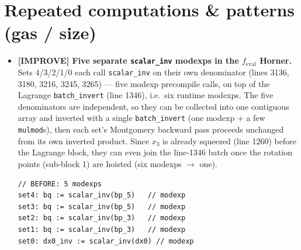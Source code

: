 \section{Repeated computations \& patterns (gas / size)}
\label{sec:pr-gas}

\begin{itemize}
  \item \textcolor{codegenblue}{\textbf{[IMPROVE] Five separate
        \texttt{scalar\_inv} modexps in the $f_\text{eval}$ Horner.}}
        Sets 4/3/2/1/0 each call \texttt{scalar\_inv} on their own
        denominator (lines 3136, 3180, 3216, 3245, 3265) --- five
        modexp precompile calls, on top of the Lagrange
        \texttt{batch\_invert} (line 1346), i.e.\ six runtime modexps. The
        five denominators are independent,
        so they can be collected into one contiguous array and inverted
        with a single \texttt{batch\_invert} (one modexp + a few
        \texttt{mulmod}s), then each set's Montgomery backward pass
        proceeds unchanged from its own inverted product. Since $x_3$ is
        already squeezed (line 1260) before the Lagrange block, they can
        even join the line-1346 batch once the rotation points
        (sub-block 1) are hoisted (six modexps $\to$ one).
\begin{lstlisting}[style=yul]
// BEFORE: 5 modexps
set4: bq := scalar_inv(bp_5)   // modexp
set3: bq := scalar_inv(bp_5)   // modexp
set2: bq := scalar_inv(bp_3)   // modexp
set1: bq := scalar_inv(bp_3)   // modexp
set0: dx0_inv := scalar_inv(dx0) // modexp


\end{lstlisting}
\end{itemize}
